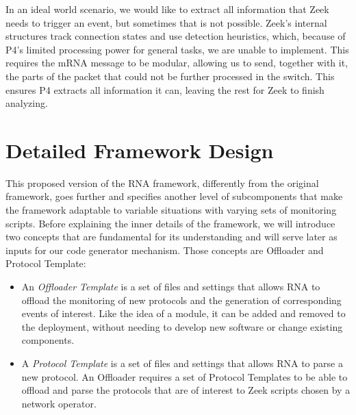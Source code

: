 In an ideal world scenario, we would like to extract all information that Zeek needs to trigger an event, but sometimes that is not possible. Zeek's internal structures track connection states and use detection heuristics, which, because of P4's limited processing power for general tasks, we are unable to implement. This requires the mRNA message to be modular, allowing us to send, together with it, the parts of the packet that could not be further processed in the switch. This ensures P4 extracts all information it can, leaving the rest for Zeek to finish analyzing.

\section{Detailed Framework Design}
\label{sec:rna:detailed_design}

This proposed version of the RNA framework, differently from the original framework, goes further and specifies another level of subcomponents that make the framework adaptable to variable situations with varying sets of monitoring scripts. Before explaining the inner details of the framework, we will introduce two concepts that are fundamental for its understanding and will serve later as inputs for our code generator mechanism. Those concepts are Offloader and Protocol Template:

\begin{itemize}
    \item An \textit{Offloader Template} is a set of files and settings that allows RNA to offload the monitoring of new protocols and the generation of corresponding events of interest. Like the idea of a module, it can be added and removed to the deployment, without needing to develop new software or change existing components.

    \item A \textit{Protocol Template} is a set of files and settings that allows RNA to parse a new protocol. An Offloader requires a set of Protocol Templates to be able to offload and parse the protocols that are of interest to Zeek scripts chosen by a network operator.
\end{itemize}

